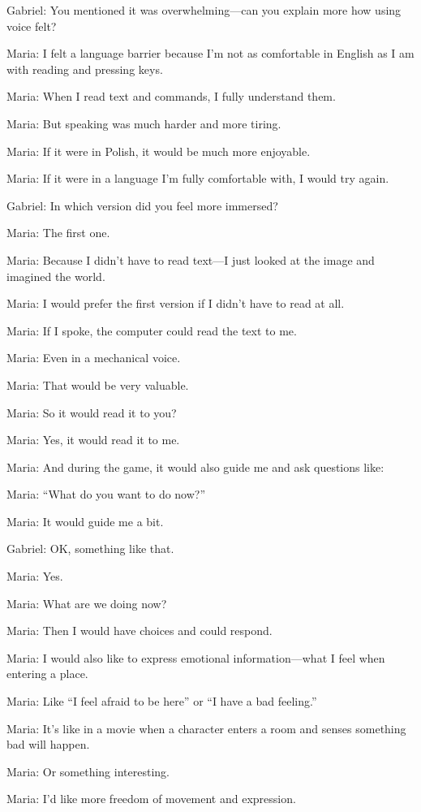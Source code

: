 Gabriel: You mentioned it was overwhelming—can you explain more how using voice felt?

Maria: I felt a language barrier because I’m not as comfortable in English as I am with reading and pressing keys.

Maria: When I read text and commands, I fully understand them.

Maria: But speaking was much harder and more tiring.

Maria: If it were in Polish, it would be much more enjoyable.

Maria: If it were in a language I’m fully comfortable with, I would try again.

Gabriel: In which version did you feel more immersed?

Maria: The first one.

Maria: Because I didn’t have to read text—I just looked at the image and imagined the world.

Maria: I would prefer the first version if I didn’t have to read at all.

Maria: If I spoke, the computer could read the text to me.

Maria: Even in a mechanical voice.

Maria: That would be very valuable.

Maria: So it would read it to you?

Maria: Yes, it would read it to me.

Maria: And during the game, it would also guide me and ask questions like:

Maria: “What do you want to do now?”

Maria: It would guide me a bit.

Gabriel: OK, something like that.

Maria: Yes.

Maria: What are we doing now?

Maria: Then I would have choices and could respond.

Maria: I would also like to express emotional information—what I feel when entering a place.

Maria: Like “I feel afraid to be here” or “I have a bad feeling.”

Maria: It’s like in a movie when a character enters a room and senses something bad will happen.

Maria: Or something interesting.

Maria: I’d like more freedom of movement and expression.

